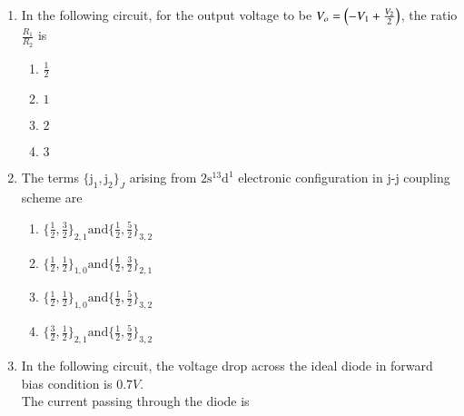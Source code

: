 \documentclass[journal,12pt,onecolumn]{IEEEtran}
\theoremstyle{remark}
\begin{document}
\begin{enumerate}[start=27]
\begin{enumerate}
    \item {}; ; ; 
    \item {}; ; ; 
    \item {}; ; ; 
    \item {}; ; ; 
\end{enumerate}
\item In the following circuit, for the output voltage to be $V_o=\left(-V_1+\frac{V_2}{2}\right)$, the ratio $\frac{R_1}{R_2}$ is
	
\begin{enumerate}
    \item $\frac{1}{2}$
    \item $1$
    \item $2$
    \item $3$
\end{enumerate}
\item The terms $\{\text{j}_1, \text{j}_2\}_J$ arising from $2\text{s}^13\text{d}^1$ electronic configuration in j-j coupling scheme are 
\begin{enumerate}
    \item $\{\frac{1}{2}, \frac{3}{2}\}_{2,1} \text{and} \{\frac{1}{2}, \frac{5}{2}\}_{3,2}$
    \item $\{\frac{1}{2}, \frac{1}{2}\}_{1,0} \text{and} \{\frac{1}{2}, \frac{3}{2}\}_{2,1}$
    \item $\{\frac{1}{2}, \frac{1}{2}\}_{1,0} \text{and} \{\frac{1}{2}, \frac{5}{2}\}_{3,2}$
    \item $\{\frac{3}{2}, \frac{1}{2}\}_{2,1} \text{and} \{\frac{1}{2}, \frac{5}{2}\}_{3,2}$
\end{enumerate}
\item In the following circuit, the voltage drop across the ideal diode in forward bias condition is $0.7V$.\\
	
	The current passing through the diode is 


\end{enumerate}
\end{document}
